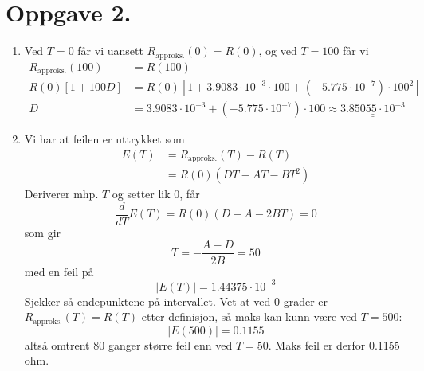 \documentclass[a4paper,11pt,norsk]{article}
\begin{document}
\section*{Oppgave 2.}
\begin{enumerate}
    \item Ved $T = 0$ får vi uansett $R_\text{approks.}(0) = R(0)$, og ved $T = 100$ får vi
        \begin{align*}
            R_\text{approks.}(100) &= R(100) \\
            R(0)[1 + 100D] &= R(0)[1 + 3.9083 \cdot 10^{-3} \cdot 100 + (-5.775 \cdot 10^{-7}) \cdot 100^2] \\
            D &= 3.9083 \cdot 10^{-3} + (-5.775 \cdot 10^{-7}) \cdot 100 \approx \underline{\underline{3.85055 \cdot 10^{-3}}}
        \end{align*}

    \item Vi har at feilen er uttrykket som
        \begin{align*}
            E(T) &= R_\text{approks.}(T) - R(T) \\
                 &= R(0)\left(DT - AT - BT^2\right)
        \end{align*}
        Deriverer mhp. $T$ og setter lik 0, får
        \[
            \frac{d}{dT} E(T) = R(0)\left(D - A - 2BT \right) = 0
        \]
        som gir
        \[
            T = -\frac{A - D}{2B} = 50
        \]
        med en feil på 
        \[
            |E(T)| = 1.44375 \cdot 10^{-3}
        \]
        Sjekker så endepunktene på intervallet. Vet at ved 0 grader er $R_\text{approks.}(T) = R(T)$ etter definisjon, så
        maks kan kunn være ved $T = 500$:
        \[
            |E(500)| = 0.1155
        \]
        altså omtrent 80 ganger større feil enn ved $T = 50$. Maks feil er derfor 0.1155 ohm.
\end{enumerate}
\end{document}
